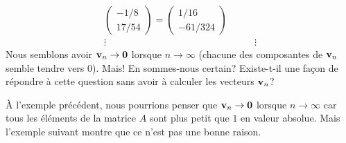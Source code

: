 {\begin{egg}
\begin{align*}
\begin{pmatrix} -1/8 \\ 17/54 \end{pmatrix} =
\begin{pmatrix} 1/16 \\ -61/324 \end{pmatrix} \\
\vdots & \qquad \vdots
\end{align*}
Nous semblons avoir $\mathbf{v}_n \to \mathbf{0}$ lorsque $n \to \infty$
(chacune des composantes de $\mathbf{v}_n$ semble tendre vers $0$).
Mais!  En sommes-nous certain?  Existe-t-il une façon de répondre à cette
question sans avoir à calculer les vecteurs $\mathbf{v}_n$?
\end{egg}

À l'exemple précédent, nous pourrions penser que
$\mathbf{v}_n \to \mathbf{0}$ lorsque $n \to \infty$ 
car tous les éléments de la matrice $A$ sont plus petit que $1$ en
valeur absolue.  Mais l'exemple suivant montre que ce n'est pas une
bonne raison.

}
